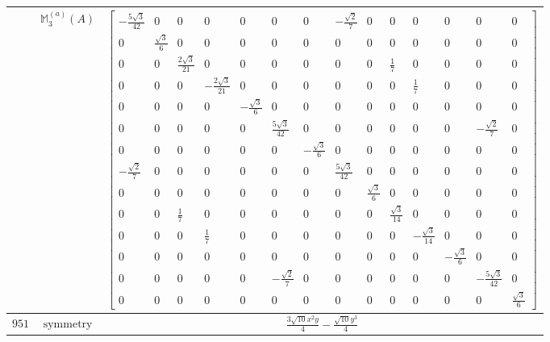 \documentclass[fleqn,8pt,landscape]{jsarticle}
\begin{document}
\begin{longtable}{ccc}
$  $ & $ \mathbb{M}_{3}^{(a)}(A) $ & $ \begin{bmatrix} - \frac{5 \sqrt{3}}{42} & 0 & 0 & 0 & 0 & 0 & 0 & - \frac{\sqrt{2}}{7} & 0 & 0 & 0 & 0 & 0 & 0 \\ 0 & \frac{\sqrt{3}}{6} & 0 & 0 & 0 & 0 & 0 & 0 & 0 & 0 & 0 & 0 & 0 & 0 \\ 0 & 0 & \frac{2 \sqrt{3}}{21} & 0 & 0 & 0 & 0 & 0 & 0 & \frac{1}{7} & 0 & 0 & 0 & 0 \\ 0 & 0 & 0 & - \frac{2 \sqrt{3}}{21} & 0 & 0 & 0 & 0 & 0 & 0 & \frac{1}{7} & 0 & 0 & 0 \\ 0 & 0 & 0 & 0 & - \frac{\sqrt{3}}{6} & 0 & 0 & 0 & 0 & 0 & 0 & 0 & 0 & 0 \\ 0 & 0 & 0 & 0 & 0 & \frac{5 \sqrt{3}}{42} & 0 & 0 & 0 & 0 & 0 & 0 & - \frac{\sqrt{2}}{7} & 0 \\ 0 & 0 & 0 & 0 & 0 & 0 & - \frac{\sqrt{3}}{6} & 0 & 0 & 0 & 0 & 0 & 0 & 0 \\ - \frac{\sqrt{2}}{7} & 0 & 0 & 0 & 0 & 0 & 0 & \frac{5 \sqrt{3}}{42} & 0 & 0 & 0 & 0 & 0 & 0 \\ 0 & 0 & 0 & 0 & 0 & 0 & 0 & 0 & \frac{\sqrt{3}}{6} & 0 & 0 & 0 & 0 & 0 \\ 0 & 0 & \frac{1}{7} & 0 & 0 & 0 & 0 & 0 & 0 & \frac{\sqrt{3}}{14} & 0 & 0 & 0 & 0 \\ 0 & 0 & 0 & \frac{1}{7} & 0 & 0 & 0 & 0 & 0 & 0 & - \frac{\sqrt{3}}{14} & 0 & 0 & 0 \\ 0 & 0 & 0 & 0 & 0 & 0 & 0 & 0 & 0 & 0 & 0 & - \frac{\sqrt{3}}{6} & 0 & 0 \\ 0 & 0 & 0 & 0 & 0 & - \frac{\sqrt{2}}{7} & 0 & 0 & 0 & 0 & 0 & 0 & - \frac{5 \sqrt{3}}{42} & 0 \\ 0 & 0 & 0 & 0 & 0 & 0 & 0 & 0 & 0 & 0 & 0 & 0 & 0 & \frac{\sqrt{3}}{6} \end{bmatrix} $ \\ \hline
$ 951 $ & $ \text{symmetry} $ & $ \frac{3 \sqrt{10} x^{2} y}{4} - \frac{\sqrt{10} y^{3}}{4} $ \\

\end{longtable}
\end{document}
